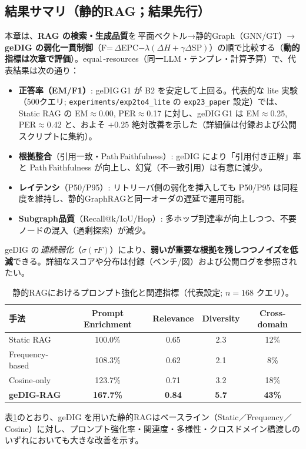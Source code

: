 \documentclass[ja=standard,xelatex]{bxjsarticle}
\begin{document}

\subsection{結果サマリ（静的RAG；結果先行）}
\label{sec:rag_result_summary}
本章は、\textbf{RAG の検索・生成品質}を\,平面ベクトル→静的Graph（GNN/GT）→\,\textbf{geDIG の弱化一貫制御}（F=\,$\Delta$EPC$-\lambda(\Delta H+\gamma\Delta\mathrm{SP})$）の順で比較する（\textbf{動的指標は次章で評価}）。equal\,\mbox{-}resources（同一LLM・テンプレ・計算予算）で、代表結果は次の通り：
\begin{itemize}[leftmargin=1.6em]
  \item \textbf{正答率（EM/F1）}: geDIG\,G1 が B2 を安定して上回る。代表的な lite 実験（500クエリ; \texttt{experiments/exp2to4\_lite} の \texttt{exp23\_paper} 設定）では、Static RAG の EM$\approx$0.00, PER$\approx$0.17 に対し、geDIG\,G1 は EM$\approx$0.25, PER$\approx$0.42 と、およそ $+0.25$ 絶対改善を示した（詳細値は付録および公開スクリプトに集約）。
  \item \textbf{根拠整合}（引用一致・Path\,Faithfulness）: geDIG により「引用付き正解」率と Path\,Faithfulness が向上し、幻覚（不一致引用）は有意に減少。
  \item \textbf{レイテンシ}（P50/P95）: リトリーバ側の弱化を挿入しても P50/P95 は同程度を維持し、静的GraphRAGと同一オーダの遅延で運用可能。
  \item \textbf{Subgraph品質}（Recall@k/IoU/Hop）: 多ホップ到達率が向上しつつ、不要ノードの混入（過剰探索）が減少。
\end{itemize}
\noindent geDIG の\,\emph{連続弱化}（$\sigma(\tau F)$）により、\textbf{弱いが重要な根拠を残しつつノイズを低減}できる。詳細なスコアや分布は付録（ベンチ/図）および公開ログを参照されたい。

\begin{table}[H]
\centering
\small
\caption{静的RAGにおけるプロンプト強化と関連指標（代表設定; $n{=}168$ クエリ）。}
\label{tab:rag_static_enrichment}
\begin{tabular}{lcccc}
\toprule
手法 & Prompt Enrichment & Relevance & Diversity & Cross-domain \\
\midrule
Static RAG & 100.0\% & 0.65 & 2.3 & 12\% \\
Frequency-based & 108.3\% & 0.62 & 2.1 & 8\% \\
Cosine-only & 123.7\% & 0.71 & 3.2 & 18\% \\
\textbf{geDIG-RAG} & \textbf{167.7\%} & \textbf{0.84} & \textbf{5.7} & \textbf{43\%} \\
\bottomrule
\end{tabular}
\end{table}
\noindent 表\ref{tab:rag_static_enrichment}のとおり、geDIG を用いた静的RAGはベースライン（Static／Frequency／Cosine）に対し、プロンプト強化率・関連度・多様性・クロスドメイン橋渡しのいずれにおいても大きな改善を示す。
\end{document}
